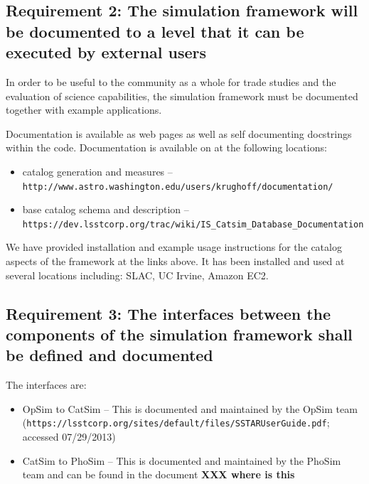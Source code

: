 \documentclass[]{article}
\begin{document}
{\subsection{Requirement 2: The simulation framework will be documented to a level that it can be
executed by external users}
In order to be useful to the community as a whole for trade studies and the evaluation of science 
capabilities, the simulation framework must be documented together with example applications.  

Documentation is available as web pages as well as self documenting docstrings within the code.  Documentation
is available on
at the following locations:
\begin{itemize}
\item catalog generation and measures -- {\tt http://www.astro.washington.edu/users/krughoff/documentation/}
\item base catalog schema and description -- {\tt https://dev.lsstcorp.org/trac/wiki/IS\_Catsim\_Database\_Documentation}
\end{itemize}

We have provided installation and example usage instructions for the catalog 
aspects of the framework at the links above.  
It has been installed and used at several locations 
including: SLAC, UC Irvine, Amazon EC2.

\subsection{Requirement 3: The interfaces between the components of the simulation framework shall be defined 
and documented}
The interfaces are:
\begin{itemize}
\item OpSim to CatSim -- This is documented and maintained by the OpSim team 
({\tt https://lsstcorp.org/sites/default/files/SSTARUserGuide.pdf}; accessed 07/29/2013)
\item CatSim to PhoSim -- This is documented and maintained by the PhoSim team and can be found in the document
{\bf XXX where is this}
\end{itemize}

}
\end{document}
